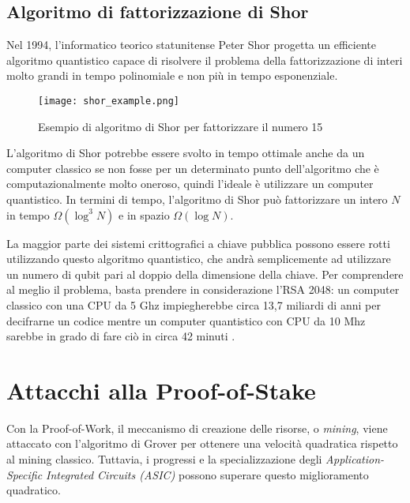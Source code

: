 \subsection{Algoritmo di fattorizzazione di Shor}
Nel 1994, l'informatico teorico statunitense Peter Shor progetta un efficiente algoritmo quantistico capace di risolvere il problema della fattorizzazione di interi molto grandi in tempo polinomiale e non più in tempo esponenziale.

\begin{figure}[h]
  \centering
  \texttt{[image: shor\_example.png]}
  \caption{Esempio di algoritmo di Shor per fattorizzare il numero 15}
  \label{fig:shor_example}
\end{figure}

L'algoritmo di Shor potrebbe essere svolto in tempo ottimale anche da un computer classico se non fosse per un determinato punto dell'algoritmo che è computazionalmente molto oneroso, quindi l'ideale è utilizzare un computer quantistico. In termini di tempo, l'algoritmo di Shor può fattorizzare un intero \(N\) in tempo \(\Omega(\log^3 N)\) e in spazio \(\Omega(\log N)\).

La maggior parte dei sistemi crittografici a chiave pubblica possono essere rotti utilizzando questo algoritmo quantistico, che andrà semplicemente ad utilizzare un numero di qubit pari al doppio della dimensione della chiave. Per comprendere al meglio il problema, basta prendere in considerazione l'RSA 2048: un computer classico con una CPU da 5 Ghz impiegherebbe circa 13,7 miliardi di anni per decifrarne un codice mentre un computer quantistico con CPU da 10 Mhz sarebbe in grado di fare ciò in circa 42 minuti \cite{kearney2021vulnerability}.

\section{Attacchi alla Proof-of-Stake}
Con la Proof-of-Work, il meccanismo di creazione delle risorse, o \textit{mining}, viene attaccato con l'algoritmo di Grover per ottenere una velocità quadratica rispetto al mining classico. Tuttavia, i progressi e la specializzazione degli \textit{Application-Specific Integrated Circuits (ASIC)} possono superare questo miglioramento quadratico.

